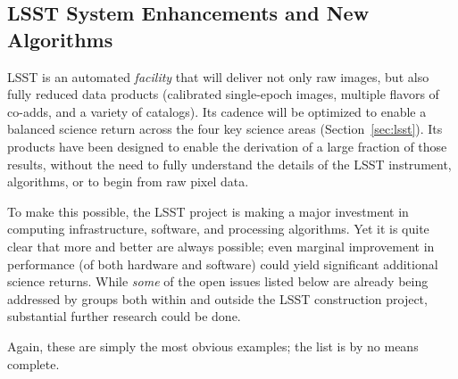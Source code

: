 \documentclass{iau}
\begin{document}
\subsection{LSST System Enhancements and New Algorithms}

LSST is an automated {\em facility} that will deliver not only raw images, 
but also fully reduced data products (calibrated single-epoch images,
multiple flavors of co-adds, and a variety of catalogs). Its cadence will 
be optimized to enable a balanced science return across the four key science
areas (Section~\ref{sec:lsst}). Its products have been designed to enable the
derivation of a large fraction of those results, without the need to fully
understand the details of the LSST instrument, algorithms, or to begin
from raw pixel data.

To make this possible, the LSST project is making a major investment in
computing infrastructure, software, and processing algorithms.  Yet it is
quite clear that more and better are always possible; even marginal
improvement in performance (of both hardware and software) could yield
significant additional science returns.  While {\em some} of the open issues
listed below are already being addressed by groups both within and outside
the LSST construction project, substantial further research could be done.

Again, these are simply the most obvious examples; the list is by no means complete.
\end{document}
